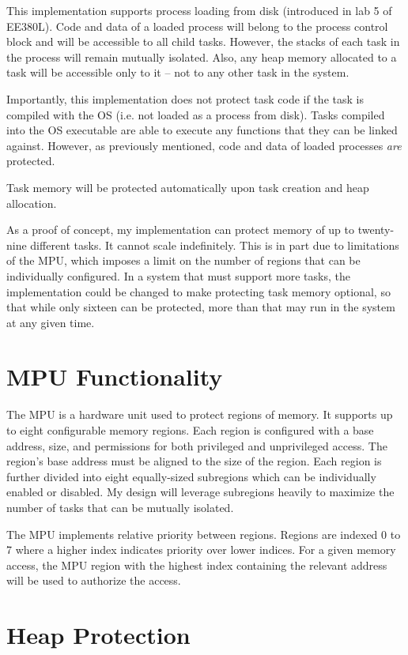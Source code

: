 This implementation supports process loading from disk (introduced in lab 5 of EE380L). Code and data of a loaded process will belong to the process control block and will be accessible to all child tasks. However, the stacks of each task in the process will remain mutually isolated. Also, any heap memory allocated to a task will be accessible only to it -- not to any other task in the system.

Importantly, this implementation does not protect task code if the task is compiled with the OS (i.e. not loaded as a process from disk). Tasks compiled into the OS executable are able to execute any functions that they can be linked against. However, as previously mentioned, code and data of loaded processes \textit{are} protected.

Task memory will be protected automatically upon task creation and heap allocation.

As a proof of concept, my implementation can protect memory of up to twenty-nine different tasks. It cannot scale indefinitely. This is in part due to limitations of the MPU, which imposes a limit on the number of regions that can be individually configured. In a system that must support more tasks, the implementation could be changed to make protecting task memory optional, so that while only sixteen can be protected, more than that may run in the system at any given time.

\section{MPU Functionality}

The MPU is a hardware unit used to protect regions of memory. It supports up to eight configurable memory regions. Each region is configured with a base address, size, and permissions for both privileged and unprivileged access. The region's base address must be aligned to the size of the region. Each region is further divided into eight equally-sized subregions which can be individually enabled or disabled. My design will leverage subregions heavily to maximize the number of tasks that can be mutually isolated.

The MPU implements relative priority between regions. Regions are indexed 0 to 7 where a higher index indicates priority over lower indices. For a given memory access, the MPU region with the highest index containing the relevant address will be used to authorize the access.

\section{Heap Protection}

